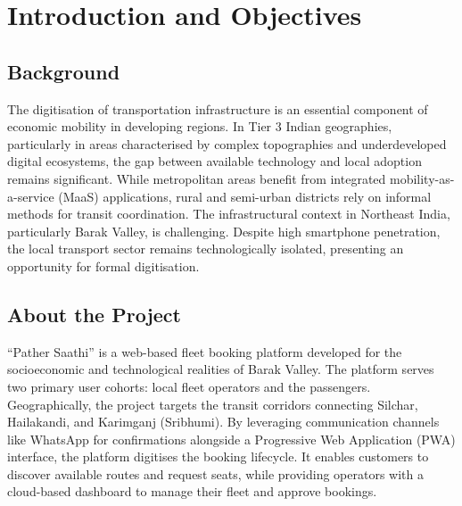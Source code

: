 \documentclass[12pt, a4paper, oneside]{report}
\begin{document}
\tableofcontents
\vspace{2cm}
\begingroup
\let\clearpage\relax
\listoffigures
\vspace{2cm}
\listoftables
\endgroup
\newpage
{}

\chapter{Introduction and Objectives}

\section{Background}
The digitisation of transportation infrastructure is an essential component of economic mobility in developing regions. In Tier 3 Indian geographies, particularly in areas characterised by complex topographies and underdeveloped digital ecosystems, the gap between available technology and local adoption remains significant. While metropolitan areas benefit from integrated mobility-as-a-service (MaaS) applications, rural and semi-urban districts rely on informal methods for transit coordination. The infrastructural context in Northeast India, particularly Barak Valley, is challenging. Despite high smartphone penetration, the local transport sector remains technologically isolated, presenting an opportunity for formal digitisation.

\section{About the Project}
``Pather Saathi'' is a web-based fleet booking platform developed for the socioeconomic and technological realities of Barak Valley. The platform serves two primary user cohorts: local fleet operators and the passengers. Geographically, the project targets the transit corridors connecting Silchar, Hailakandi, and Karimganj (Sribhumi). By leveraging communication channels like WhatsApp for confirmations alongside a Progressive Web Application (PWA) interface, the platform digitises the booking lifecycle. It enables customers to discover available routes and request seats, while providing operators with a cloud-based dashboard to manage their fleet and approve bookings.
\end{document}
